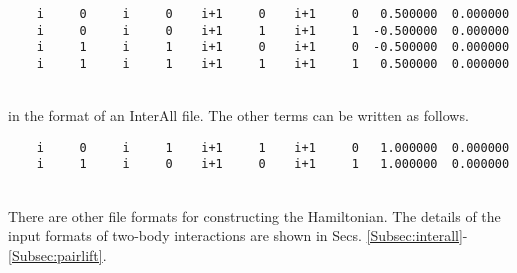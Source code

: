\begin{description}
\begin{minipage}{16cm}
\begin{screen}
\begin{verbatim}
    i     0     i     0    i+1     0    i+1     0   0.500000  0.000000
    i     0     i     0    i+1     1    i+1     1  -0.500000  0.000000
    i     1     i     1    i+1     0    i+1     0  -0.500000  0.000000
    i     1     i     1    i+1     1    i+1     1   0.500000  0.000000
\end{verbatim}
\end{screen}
\end{minipage}
~\\
in the format of an InterAll file. The other terms can be written as follows.\\
\begin{minipage}{16cm}
\begin{screen}
\begin{verbatim}
    i     0     i     1    i+1     1    i+1     0   1.000000  0.000000
    i     1     i     0    i+1     0    i+1     1   1.000000  0.000000
\end{verbatim}
\end{screen}
\end{minipage}
~\\
There are other file formats for constructing the Hamiltonian.
The details of the input formats of two-body interactions are shown in
Secs. \ref{Subsec:interall}-\ref{Subsec:pairlift}.

\end{description}

